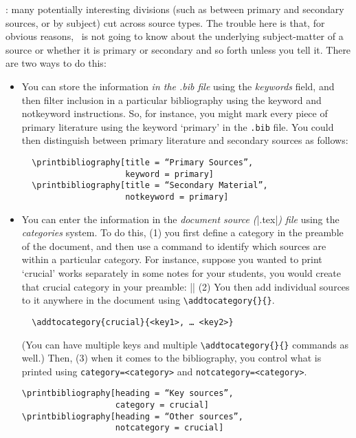 : many
potentially interesting divisions (such as between primary and secondary
sources, or by subject) cut across source types. The trouble here is that,
for obvious reasons, \biblatex\ is not going to know about the underlying
subject-matter of a source or whether it is primary or secondary and so
forth unless you tell it. There are two ways to do this:
\begin{itemize}
\item
  You can store the information \emph{in the .bib file} using the
  \emph{keywords} field, and then filter inclusion in a particular
  bibliography using the keyword and notkeyword instructions. So, for
  instance, you might mark every piece of primary literature using the
  keyword `primary' in the \texttt{.bib} file. You could then
  distinguish between primary literature and secondary sources as
  follows:
\begin{verbatim}
  \printbibliography[title = “Primary Sources”,
                     keyword = primary]
  \printbibliography[title = “Secondary Material”,
                     notkeyword = primary]
\end{verbatim}
\item You can enter the information in the \emph{document source
    (}|.tex|\emph{) file} using the \emph{categories} system. To do this, (1) you
  first define a category in the preamble of the document, and then
  use a command to identify which sources are within a particular
  category. For instance, suppose you wanted to print `crucial'
  works separately in some notes for your students, you would create
  that crucial category in your preamble:
  || (2) You then add individual
  sources to it anywhere in the document using
  \texttt{\textbackslash{}addtocategory\{\}\{\}}.

\begin{verbatim}
  \addtocategory{crucial}{<key1>, … <key2>}
\end{verbatim}

(You can have multiple keys and multiple
\texttt{\textbackslash{}addtocategory\{\}\{\}} commands as well.)
Then, (3) when it comes to the bibliography, you control what is printed
using \texttt{category=\textless{}category\textgreater{}} and
\texttt{notcategory=\textless{}category\textgreater{}}.
\begin{verbatim}
\printbibliography[heading = “Key sources”,
                   category = crucial]
\printbibliography[heading = “Other sources”,
                   notcategory = crucial]
\end{verbatim}
\end{itemize}

